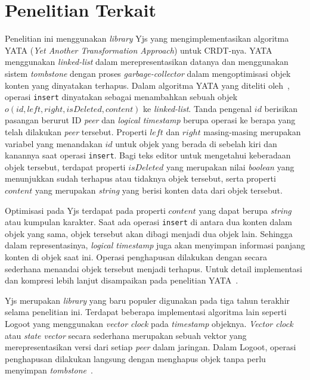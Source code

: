 \section{Penelitian Terkait}
\label{sec:penelitian_terkait}

Penelitian ini menggunakan \textit{library} Yjs yang mengimplementasikan algoritma YATA (\textit{Yet Another Transformation Approach}) untuk CRDT-nya. YATA menggunakan \textit{linked-list} dalam merepresentasikan datanya dan menggunakan sistem \textit{tombstone} dengan proses \textit{garbage-collector} dalam mengoptimisasi objek konten yang dinyatakan terhapus. Dalam algoritma YATA yang diteliti oleh~\cite{Nicolaescu2016yjs}, operasi \texttt{insert} dinyatakan sebagai menambahkan sebuah objek $o(id, left, right, isDeleted, content)$ ke \textit{linked-list}. Tanda pengenal $id$ berisikan pasangan berurut ID \textit{peer} dan \textit{logical timestamp} berupa operasi ke berapa yang telah dilakukan \textit{peer} tersebut. Properti $left$ dan $right$ masing-masing merupakan variabel yang menandakan $id$ untuk objek yang berada di sebelah kiri dan kanannya saat operasi \texttt{insert}. Bagi teks editor untuk mengetahui keberadaan objek tersebut, terdapat properti $isDeleted$ yang merupakan nilai \textit{boolean} yang menunjukkan sudah terhapus atau tidaknya objek tersebut, serta properti $content$ yang merupakan \textit{string} yang berisi konten data dari objek tersebut.

Optimisasi pada Yjs terdapat pada properti $content$ yang dapat berupa \textit{string} atau kumpulan karakter. Saat ada operasi \texttt{insert} di antara dua konten dalam objek yang sama, objek tersebut akan dibagi menjadi dua objek lain. Sehingga dalam representasinya, \textit{logical timestamp} juga akan menyimpan informasi panjang konten di objek saat ini. Operasi penghapusan dilakukan dengan secara sederhana menandai objek tersebut menjadi terhapus. Untuk detail implementasi dan kompresi lebih lanjut disampaikan pada penelitian YATA~\citep{Nicolaescu2016yjs}.

Yjs merupakan \textit{library} yang baru populer digunakan pada tiga tahun terakhir selama penelitian ini. Terdapat beberapa implementasi algoritma lain seperti Logoot yang menggunakan \textit{vector clock} pada \textit{timestamp} objeknya. \textit{Vector clock} atau \textit{state vector} secara sederhana merupakan sebuah vektor yang merepresentasikan versi dari setiap \textit{peer} dalam jaringan. Dalam Logoot, operasi penghapusan dilakukan langsung dengan menghapus objek tanpa perlu menyimpan \textit{tombstone}~\citep{weiss2009logoot}.

